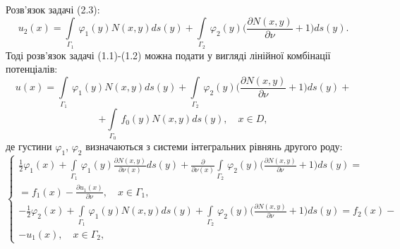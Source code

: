 \documentclass[a4 paper,12pt,ukrainian]{report}
\begin{document}
\hspace*{\parindent}Розв'язок задачі (2.3):
\begin{equation}
u_{2}(x) = \int\limits_{\Gamma_{1}} \, \varphi_{1}(y)N(x,y)ds(y)+\int\limits_{\Gamma_{2}} \, \varphi_{2}(y)\bigg(\frac{\partial N(x,y)}{\partial\nu} + 1\bigg)ds(y). 
\end{equation}
\hspace*{\parindent}Тоді розв'язок задачі (1.1)-(1.2) можна подати у вигляді лінійної комбінації потенціалів:
\begin{equation}
u(x) = \int\limits_{\Gamma_{1}} \, \varphi_{1}(y)N(x,y)ds(y)+\int\limits_{\Gamma_{2}} \, \varphi_{2}(y)\bigg(\frac{\partial N(x,y)}{\partial\nu} + 1\bigg)ds(y)+
\end{equation}
\begin{equation*}
+\int\limits_{\Gamma_{0}} \, f_{0}(y)N(x,y) ds(y), \quad x \in D,
\end{equation*}
де густини $\varphi_{1}$, $\varphi_{2}$ визначаються з системи інтегральних рівнянь другого роду:
\begin{equation}\label{13}
 \left\{
\begin{array}{c}
   \displaystyle
\frac{1}{2}\varphi_{1}(x) + \int\limits_{\Gamma_1} \, \varphi_1(y)\frac{\partial N(x,y)}{\partial\nu(x)}ds(y)+\frac{\partial }{\partial\nu(x)}\int\limits_{\Gamma_2} \, \varphi_2(y)\bigg(\frac{\partial N(x,y)}{\partial\nu} + 1\bigg)ds(y) = \\=f_1(x) -\frac{\partial u_{1}(x)}{\partial\nu}, \quad x\in \Gamma_1,\\

	\displaystyle
  -\frac{1}{2}\varphi_{2}(x) + \int\limits_{\Gamma_1} \, \varphi_1(y)N(x,y)ds(y)+\int\limits_{\Gamma_2} \, \varphi_2(y)\bigg(\frac{\partial N(x,y)}{\partial\nu} + 1\bigg)ds(y)=f_2(x)- \\ -u_{1}(x), \quad x\in \Gamma_2,
 \end{array}
\right.
\end{equation}


\newpage
\end{document}
